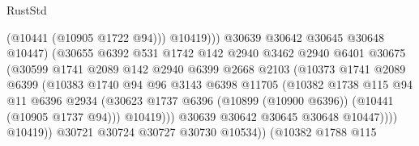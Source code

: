\begin{lexlean}{RustStd}
\begin{coremodule}
                                        (@10441 (@10905 @1722 @94)))
                                      @10419)))
                                @30639
                                @30642
                                @30645
                                @30648
                                @10447)
                              (@30655
                                @6392
                                @531
                                @1742
                                @142
                                @2940
                                @3462
                                @2940
                                @6401
                                @30675
                                (@30599
                                  @1741
                                  @2089
                                  @142
                                  @2940
                                  @6399
                                  @2668
                                  @2103
                                  (@10373
                                    @1741
                                    @2089
                                    @6399
                                    (@10383
                                      @1740
                                      @94
                                      @96
                                      @3143
                                      @6398
                                      @11705
                                      (@10382
                                        @1738
                                        @115
                                        @94
                                        @11
                                        @6396
                                        @2934
                                        (@30623
                                          @1737
                                          @6396
                                          (@10899 (@10900 @6396))
                                          (@10441 (@10905 @1737 @94)))
                                        @10419)))
                                  @30639
                                  @30642
                                  @30645
                                  @30648
                                  @10447))))
                          @10419))
                      @30721
                      @30724
                      @30727
                      @30730
                      @10534))
                  (@10382
                    @1788
                    @115

\end{coremodule}
\end{lexlean}
